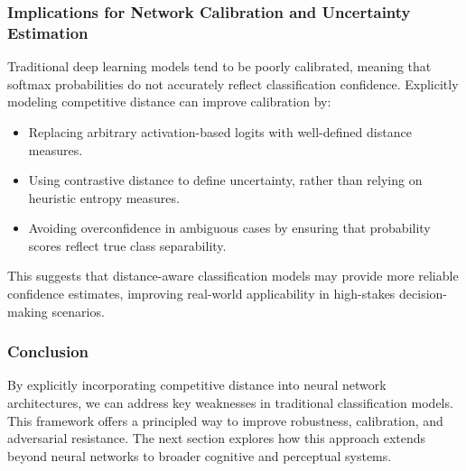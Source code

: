 \subsubsection{Implications for Network Calibration and Uncertainty Estimation}

Traditional deep learning models tend to be poorly calibrated, meaning that softmax probabilities do not accurately reflect classification confidence. Explicitly modeling competitive distance can improve calibration by:

\begin{itemize}
    \item Replacing arbitrary activation-based logits with well-defined distance measures.
    \item Using contrastive distance to define uncertainty, rather than relying on heuristic entropy measures.
    \item Avoiding overconfidence in ambiguous cases by ensuring that probability scores reflect true class separability.
\end{itemize}

This suggests that distance-aware classification models may provide more reliable confidence estimates, improving real-world applicability in high-stakes decision-making scenarios.

\subsubsection{Conclusion}

By explicitly incorporating competitive distance into neural network architectures, we can address key weaknesses in traditional classification models. This framework offers a principled way to improve robustness, calibration, and adversarial resistance. The next section explores how this approach extends beyond neural networks to broader cognitive and perceptual systems.
